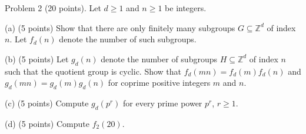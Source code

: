 \begin{exercise}
\label{algebra:2016:2}
Problem 2 (20 points). Let $d \geq 1$ and $n \geq 1$ be integers.

(a) (5 points) Show that there are only finitely many subgroups $G \subseteq \mathbb{Z}^d$ of index $n$. Let $f_d(n)$ denote the number of such subgroups.

(b) (5 points) Let $g_d(n)$ denote the number of subgroups $H \subseteq \mathbb{Z}^d$ of index $n$ such that the quotient group is cyclic. Show that $f_d(mn) = f_d(m)f_d(n)$ and $g_d(mn) = g_d(m)g_d(n)$ for coprime positive integers $m$ and $n$.

(c) (5 points) Compute $g_d(p^r)$ for every prime power $p^r$, $r \geq 1$.

(d) (5 points) Compute $f_2(20)$.
\end{exercise}
